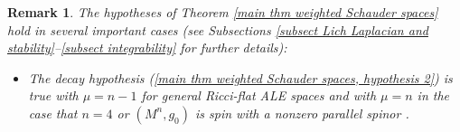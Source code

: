 \documentclass[12pt]{amsart}
\renewcommand{\1}{{\mathbf 1}}
\theoremstyle{others}
\newtheorem{rmk}[thm]{Remark}
\numberwithin{equation}{section}
\begin{document}
\begin{rmk}
    The hypotheses of Theorem \ref{main thm weighted Schauder spaces} hold in several important cases (see Subsections \ref{subsect Lich Laplacian and stability}--\ref{subsect integrability} for further details):

    \begin{itemize}


        \item The decay hypothesis (\ref{main thm weighted Schauder spaces, hypothesis 2}) is true with $\mu = n-1$  for general Ricci-flat ALE spaces \cite[Theorem 2.7, Remark 2.10]{DeruelleKroncke20} and with $\mu = n$  in the case that $n=4$ \cite{BKN89} or $(M^n, g_0)$ is spin with a nonzero parallel spinor \cite{KronckePetersen22}.

        \vspace{2mm}

        

\end{itemize}
\end{rmk}
\end{document}
